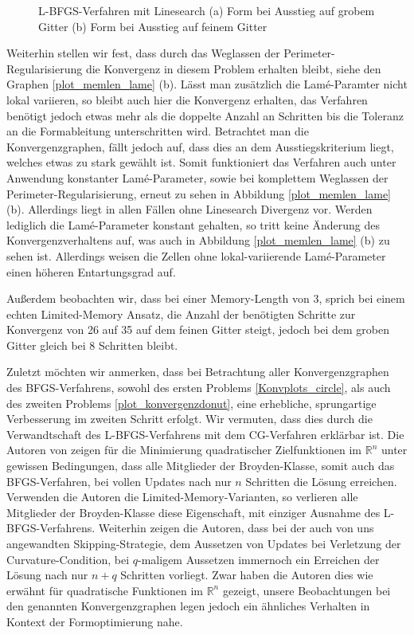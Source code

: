 \begin{figure}
\begin{subfigure}{0.5\textwidth}
	\caption{}	
	\end{subfigure}
\caption{L-BFGS-Verfahren mit Linesearch (a) Form bei Ausstieg auf grobem Gitter (b) Form bei Ausstieg auf feinem Gitter}
\label{brokendonut_bfgs_linesearch}
\end{figure}


Weiterhin stellen wir fest, dass durch das Weglassen der Perimeter-Regularisierung die Konvergenz in diesem Problem erhalten bleibt, siehe den Graphen \ref{plot_memlen_lame} (b). Lässt man zusätzlich die Lamé-Paramter nicht lokal variieren, so bleibt auch hier die Konvergenz erhalten, das Verfahren benötigt jedoch etwas mehr als die doppelte Anzahl an Schritten bis die Toleranz an die Formableitung unterschritten wird. Betrachtet man die Konvergenzgraphen, fällt jedoch auf, dass dies an dem Ausstiegskriterium liegt, welches etwas zu stark gewählt ist. Somit funktioniert das Verfahren auch unter Anwendung konstanter Lamé-Parameter, sowie bei komplettem Weglassen der Perimeter-Regularisierung, erneut zu sehen in Abbildung \ref{plot_memlen_lame} (b). Allerdings liegt in allen Fällen ohne Linesearch Divergenz vor. Werden lediglich die Lamé-Parameter konstant gehalten, so tritt keine Änderung des Konvergenzverhaltens auf, was auch in Abbildung \ref{plot_memlen_lame} (b) zu sehen ist. Allerdings weisen die Zellen ohne lokal-variierende Lamé-Parameter einen höheren Entartungsgrad auf.

Außerdem beobachten wir, dass bei einer Memory-Length von 3, sprich bei einem echten Limited-Memory Ansatz, die Anzahl der benötigten Schritte zur Konvergenz von 26 auf 35 auf dem feinen Gitter steigt, jedoch bei dem groben Gitter gleich bei 8 Schritten bleibt. 

Zuletzt möchten wir anmerken, dass bei Betrachtung aller Konvergenzgraphen des BFGS-Verfahrens, sowohl des ersten Problems \ref{Konvplots_circle}, als auch des zweiten Problems \ref{plot_konvergenzdonut}, eine erhebliche, sprungartige Verbesserung im zweiten Schritt erfolgt. Wir vermuten, dass dies durch die Verwandtschaft des L-BFGS-Verfahrens mit dem CG-Verfahren erklärbar ist. Die Autoren von \cite{bfgsjumpconv} zeigen für die Minimierung quadratischer Zielfunktionen im $\mathbb{R}^n$ unter gewissen Bedingungen, dass alle Mitglieder der Broyden-Klasse, somit auch das BFGS-Verfahren, bei vollen Updates nach nur $n$ Schritten die Lösung erreichen. Verwenden die Autoren die Limited-Memory-Varianten, so verlieren alle Mitglieder der Broyden-Klasse diese Eigenschaft, mit einziger Ausnahme des L-BFGS-Verfahrens. Weiterhin zeigen die Autoren, dass bei der auch von uns angewandten Skipping-Strategie, dem Aussetzen von Updates bei Verletzung der Curvature-Condition, bei $q$-maligem Aussetzen immernoch ein Erreichen der Lösung nach nur $n+q$ Schritten vorliegt. Zwar haben die Autoren dies wie erwähnt für quadratische Funktionen im $\mathbb{R}^n$ gezeigt, unsere Beobachtungen bei den genannten Konvergenzgraphen legen jedoch ein ähnliches Verhalten in Kontext der Formoptimierung nahe. 

